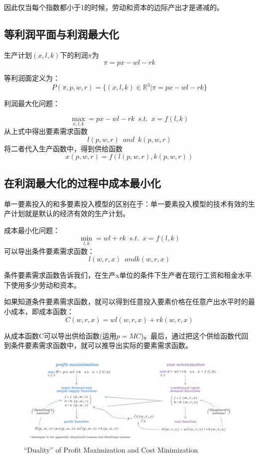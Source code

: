 \documentclass{article}
\begin{document}
因此仅当每个指数都小于1的时候，劳动和资本的边际产出才是递减的。

\subsection{等利润平面与利润最大化}

生产计划$ (x,l,k) $下的利润$ \pi $为
\[
\pi=px-wl-rk
\]

等利润面定义为：
\[
P(\pi,p,w,r)=\{(x,l,k)\in\mathbb{R}^3|\pi=px-wl-rk\}
\]

利润最大化问题：

\[
\max\limits_{x,l,k}=px-wl-rk\enspace s.t.\enspace x=f(l,k)
\]
从上式中得出要素需求函数
\[
l(p,w,r)\enspace and\enspace k(p,w,r)
\]
将二者代入生产函数中，得到供给函数
\[
x(p,w,r)=f(l(p,w,r),k(p,w,r))
\]

\subsection{在利润最大化的过程中成本最小化}

单一要素投入的和多要素投入模型的区别在于：单一要素投入模型的技术有效的生产计划就是默认的经济有效的生产计划。

成本最小化问题：
\[
\min\limits_{l,k}=wl+rk\enspace s.t.\enspace x=f(l,k)
\]
可以导出条件要素需求函数：
\[
l(w,r,x)\enspace and k(w,r,x)
\]

条件要素需求函数告诉我们，在生产x单位的条件下生产者在现行工资和租金水平下使用多少劳动和资本。

\hspace*{\fill}

如果知道条件要素需求函数，就可以得到任意投入要素价格在任意产出水平时的最小成本，即成本函数：
\[
C(w,r,x)=wl(w,r,x)+rk(w,r,x)
\]

从成本函数C可以导出供给函数(运用$ p=MC $)。最后，通过把这个供给函数代回到条件要素需求函数中，就可以推导出实际的要素需求函数。

\begin{figure}[H] %
	\centering %
	\includegraphics[width=1\textwidth]{12_5} %
	\caption{“Duality” of Profit Maximization and Cost Minimization} %
	\label{Fig.main6} %
\end{figure}
\end{document}
